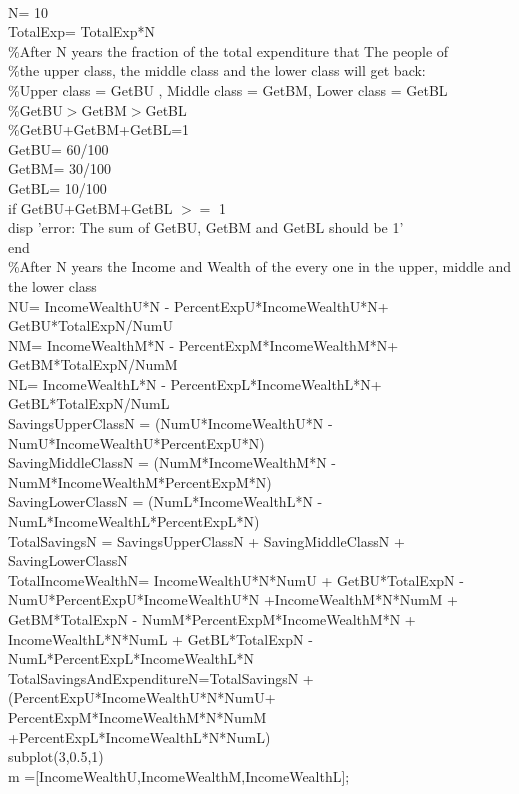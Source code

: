 \documentclass[12pt,a4paper]{article}
\begin{document}
\medskip
\\ N= 10
\\TotalExp= TotalExp*N 
\medskip
\\ \%After N years the fraction of the total expenditure that The people of 
\\ \%the upper class, the middle class and the lower class will get back:
\\ \%Upper  class = GetBU  , Middle class = GetBM, Lower  class = GetBL 
\\ \%GetBU$>$GetBM$>$GetBL
\\ \%GetBU+GetBM+GetBL=1
\medskip
\\GetBU= 60/100
\\GetBM= 30/100
\\GetBL= 10/100
\medskip
\\ if GetBU+GetBM+GetBL $>=$ 1
\\ \indent disp 'error: The sum of GetBU, GetBM and GetBL should be 1'
\\ end 
\medskip
\\ \%After N years the Income and Wealth of the every one in the upper, middle and the lower class
\medskip
\\NU= IncomeWealthU*N - PercentExpU*IncomeWealthU*N+ GetBU*TotalExpN/NumU  
\\NM= IncomeWealthM*N - PercentExpM*IncomeWealthM*N+ GetBM*TotalExpN/NumM  
\\NL= IncomeWealthL*N - PercentExpL*IncomeWealthL*N+ GetBL*TotalExpN/NumL 
\medskip
\\SavingsUpperClassN = (NumU*IncomeWealthU*N - NumU*IncomeWealthU*PercentExpU*N)
\\SavingMiddleClassN = (NumM*IncomeWealthM*N - NumM*IncomeWealthM*PercentExpM*N)
\\SavingLowerClassN =  (NumL*IncomeWealthL*N - NumL*IncomeWealthL*PercentExpL*N)
\medskip
\\TotalSavingsN = SavingsUpperClassN + SavingMiddleClassN + SavingLowerClassN
\medskip
\\TotalIncomeWealthN= IncomeWealthU*N*NumU + GetBU*TotalExpN - NumU*PercentExpU*IncomeWealthU*N +IncomeWealthM*N*NumM + GetBM*TotalExpN - NumM*PercentExpM*IncomeWealthM*N + IncomeWealthL*N*NumL + GetBL*TotalExpN - NumL*PercentExpL*IncomeWealthL*N 
\medskip
\\TotalSavingsAndExpenditureN=TotalSavingsN
+(PercentExpU*IncomeWealthU*N*NumU+
PercentExpM*IncomeWealthM*N*NumM
+PercentExpL*IncomeWealthL*N*NumL)
\medskip
\\subplot(3,0.5,1)
\\m =[IncomeWealthU,IncomeWealthM,IncomeWealthL];
\end{document}
